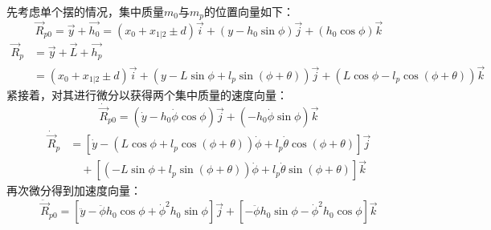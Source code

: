             先考虑单个摆的情况，集中质量$m_0$与$m_p$的位置向量如下：
            \begin{equation}
            \vec{R}_{p0} = \vec{y} + \vec{h_0} = (x_0 + x_{1|2} \pm d)\vec{i} + (y - h_0 \sin \phi)\vec{j} + (h_0 \cos \phi)\vec{k}
            \end{equation}
            \begin{equation}
            \begin{aligned}
            \vec{R}_p &= \vec{y} + \vec{L} + \vec{h_p} \\
            &= (x_0 + x_{1|2} \pm d)\vec{i} + (y - L \sin \phi + l_p \sin(\phi + \theta))\vec{j} + (L \cos \phi - l_p \cos(\phi + \theta))\vec{k}
            \end{aligned}
            \end{equation}
            紧接着，对其进行微分以获得两个集中质量的速度向量：
            \begin{equation}
            \dot{\vec{R}}_{p0} = (\dot{y} - h_0 \dot{\phi} \cos \phi)\vec{j} + (-h_0 \dot{\phi} \sin \phi)\vec{k}
            \end{equation}
            \begin{equation}
            \begin{aligned}
            \dot{\vec{R}}_p &= \left[ \dot{y} - \left(L \cos \phi + l_p \cos(\phi + \theta)\right)\dot{\phi} + l_p \dot{\theta} \cos(\phi + \theta) \right]\vec{j} \\
            &\quad + \left[ \left(-L \sin \phi + l_p \sin(\phi + \theta)\right)\dot{\phi} + l_p \dot{\theta} \sin(\phi + \theta) \right]\vec{k}
            \end{aligned}
            \end{equation}
            再次微分得到加速度向量：
            \begin{equation}
            \ddot{\vec{R}}_{p0} = \left[ \ddot{y} - \ddot{\phi} h_0 \cos \phi + \dot{\phi}^2 h_0 \sin \phi \right]\vec{j} + \left[ -\ddot{\phi} h_0 \sin \phi - \dot{\phi}^2 h_0 \cos \phi \right]\vec{k}
            \end{equation}
